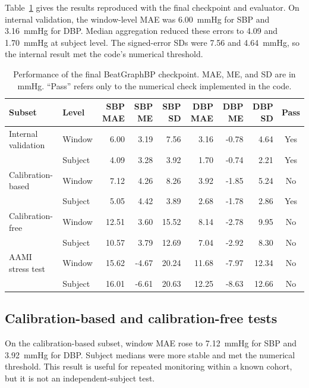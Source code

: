 \documentclass[journal,twoside,web]{ieeecolor}
\begin{document}
Table~\ref{tab:mainresults} gives the results reproduced with the final checkpoint and evaluator. On internal validation, the window-level MAE was 6.00~mmHg for SBP and 3.16~mmHg for DBP. Median aggregation reduced these errors to 4.09 and 1.70~mmHg at subject level. The signed-error SDs were 7.56 and 4.64~mmHg, so the internal result met the code's numerical threshold.

\begin{table}[!t]
\caption{Performance of the final BeatGraphBP checkpoint. MAE, ME, and SD are in mmHg. ``Pass'' refers only to the numerical check implemented in the code.}
\label{tab:mainresults}
\centering
\setlength{\tabcolsep}{4.5pt}
\begin{tabular}{llrrrrrrc}
\toprule
Subset & Level & SBP MAE & SBP ME & SBP SD & DBP MAE & DBP ME & DBP SD & Pass \\
\midrule
Internal validation & Window  & 6.00 & 3.19 & 7.56 & 3.16 & -0.78 & 4.64 & Yes \\
                    & Subject & 4.09 & 3.28 & 3.92 & 1.70 & -0.74 & 2.21 & Yes \\
\midrule
Calibration-based  & Window  & 7.12 & 4.26 & 8.26 & 3.92 & -1.85 & 5.24 & No \\
                    & Subject & 5.05 & 4.42 & 3.89 & 2.68 & -1.78 & 2.86 & Yes \\
\midrule
Calibration-free   & Window  & 12.51 & 3.60 & 15.52 & 8.14 & -2.78 & 9.95 & No \\
                    & Subject & 10.57 & 3.79 & 12.69 & 7.04 & -2.92 & 8.30 & No \\
\midrule
AAMI stress test   & Window  & 15.62 & -4.67 & 20.24 & 11.68 & -7.97 & 12.34 & No \\
                    & Subject & 16.01 & -6.61 & 20.63 & 12.25 & -8.63 & 12.66 & No \\
\bottomrule
\end{tabular}
\end{table}

\subsection{Calibration-based and calibration-free tests}

On the calibration-based subset, window MAE rose to 7.12~mmHg for SBP and 3.92~mmHg for DBP. Subject medians were more stable and met the numerical threshold. This result is useful for repeated monitoring within a known cohort, but it is not an independent-subject test.
\end{document}
